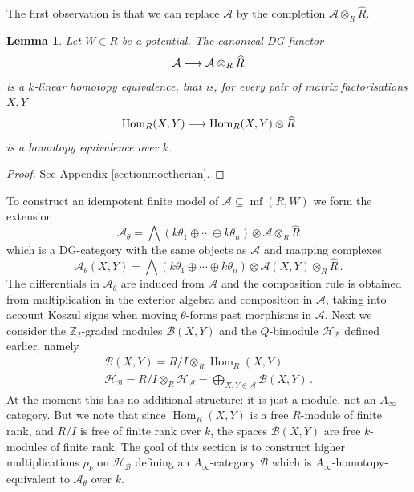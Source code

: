 \documentclass[english,letter paper,12pt,leqno]{article}
\newtheorem{lemma}[theorem]{Lemma}
\theoremstyle{example}
\numberwithin{equation}{section}
\def\AA{\mathcal{A}}
\def\BB{\mathcal{B}}
\def\HH{\HH}
\def\HH{\mathcal{H}}
\def\Hom{\operatorname{Hom}}
\def\be{\begin{equation}}
\def\ee{\end{equation}}
\def\nZ{\mathds{Z}}
\DeclareMathOperator{\mfdg}{mf}
\begin{document}
The first observation is that we can replace $\AA$ by the completion $\AA \otimes_R \widehat{R}$.

\begin{lemma}\label{lemma:completion_he} Let $W \in R$ be a potential. The canonical DG-functor
\[
\AA \lto \AA \otimes_R \widehat{R}
\]
is a $k$-linear homotopy equivalence, that is, for every pair of matrix factorisations $X,Y$
\[
\Hom_R(X,Y) \lto \Hom_R(X,Y) \otimes \widehat{R}
\]
is a homotopy equivalence over $k$.
\end{lemma}
\begin{proof}
See Appendix \ref{section:noetherian}.
\end{proof}

To construct an idempotent finite model of $\AA \subseteq \mfdg(R,W)$ we form the extension
\be\label{eq:defn_AAtheta}
\AA_{\theta} = \bigwedge( k \theta_1 \oplus \cdots \oplus k \theta_n ) \otimes \AA \otimes_R \widehat{R}
\ee
which is a DG-category with the same objects as $\AA$ and mapping complexes
\[
\AA_{\theta}( X, Y ) = \bigwedge( k \theta_1 \oplus \cdots \oplus k \theta_n ) \otimes \AA(X,Y) \otimes_R \widehat{R}\,.
\]
The differentials in $\AA_{\theta}$ are induced from $\AA$ and the composition rule is obtained from multiplication in the exterior algebra and composition in $\AA$, taking into account Koszul signs when moving $\theta$-forms past morphisms in $\AA$. Next we consider the $\nZ_2$-graded modules $\BB(X,Y)$ and the $Q$-bimodule $\HH_{\BB}$ defined earlier, namely
\begin{gather*}
\BB(X,Y) = R/I \otimes_R \Hom_R(X,Y)\\
\HH_{\BB} = R/I \otimes_R \HH_{\AA} = \bigoplus_{X,Y \in \AA} \BB(X,Y)\,.
\end{gather*}
At the moment this has no additional structure: it is just a module, not an $A_\infty$-category. But we note that since $\Hom_R(X,Y)$ is a free $R$-module of finite rank, and $R/I$ is free of finite rank over $k$, the spaces $\BB(X,Y)$ are free $k$-modules of finite rank. The goal of this section is to construct higher multiplications $\rho_k$ on $\HH_{\BB}$ defining an $A_\infty$-category $\BB$ which is $A_\infty$-homotopy-equivalent to $\AA_\theta$ over $k$. %
\end{document}

